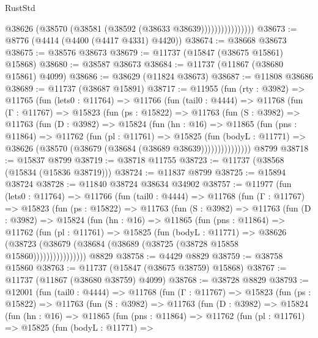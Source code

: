 \begin{lexlean}{RustStd}
\begin{coremodule}
                          @38626 (@38570 (@38581 (@38592 (@38633 @38639))))))))))))))))
@38673 := @8776 (@4414 (@4400 (@4417 @4331) @4420))
@38674 := @38668 @38673
@38675 := @38576 @38673
@38679 := @11737 (@15847 (@38675 @15861) @15868)
@38680 := @38587 @38673
@38684 := @11737 (@11867 (@38680 @15861) @4099)
@38686 := @38629 (@11824 @38673)
@38687 := @11808 @38686
@38689 := @11737 (@38687 @15891)
@38717 := @11955
    (fun (rty : @3982) =>
    @11765
      (fun (lets0 : @11764) =>
      @11766
        (fun (tail0 : @4444) =>
        @11768
          (fun (Γ : @11767) =>
          @15823
            (fun (ps : @15822) =>
            @11763
              (fun (S : @3982) =>
              @11763
                (fun (D : @3982) =>
                @15824
                  (fun (hn : @16) =>
                  @11865
                    (fun (pns : @11864) =>
                    @11762
                      (fun (pl : @11761) =>
                      @15825
                        (fun (bodyL : @11771) =>
                        @38626 (@38570 (@38679 (@38684 (@38689 @38639)))))))))))))))
    @8799
@38718 := @15837 @8799
@38719 := @38718 @11755
@38723 := @11737 (@38568 (@15834 (@15836 @38719)))
@38724 := @11837 @8799
@38725 := @15894 @38724
@38728 := @11840 @38724 @38634 @34902
@38757 := @11977
    (fun (lets0 : @11764) =>
    @11766
      (fun (tail0 : @4444) =>
      @11768
        (fun (Γ : @11767) =>
        @15823
          (fun (ps : @15822) =>
          @11763
            (fun (S : @3982) =>
            @11763
              (fun (D : @3982) =>
              @15824
                (fun (hn : @16) =>
                @11865
                  (fun (pns : @11864) =>
                  @11762
                    (fun (pl : @11761) =>
                    @15825
                      (fun (bodyL : @11771) =>
                      @38626
                        (@38723
                          (@38679 (@38684 (@38689 (@38725 (@38728 @15858 @15860))))))))))))))))
    @8829
@38758 := @4429 @8829
@38759 := @38758 @15860
@38763 := @11737 (@15847 (@38675 @38759) @15868)
@38767 := @11737 (@11867 (@38680 @38759) @4099)
@38768 := @38728 @8829
@38793 := @12001
    (fun (tail0 : @4444) =>
    @11768
      (fun (Γ : @11767) =>
      @15823
        (fun (ps : @15822) =>
        @11763
          (fun (S : @3982) =>
          @11763
            (fun (D : @3982) =>
            @15824
              (fun (hn : @16) =>
              @11865
                (fun (pns : @11864) =>
                @11762
                  (fun (pl : @11761) =>
                  @15825
                    (fun (bodyL : @11771) =>

\end{coremodule}
\end{lexlean}
